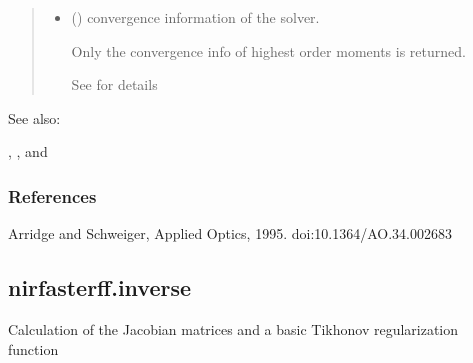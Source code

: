 \documentclass[letterpaper,10pt,english]{sphinxmanual}
\begin{document}
\begin{fulllineitems}
\begin{quote}
\begin{description}
\begin{itemize}
\item {} 
\sphinxAtStartPar
{} () \textendash{} convergence information of the solver.

\sphinxAtStartPar
Only the convergence info of highest order moments is returned.

\sphinxAtStartPar
See {\hyperref[\detokenize{_autosummary/nirfasterff.utils.ConvergenceInfo:nirfasterff.utils.ConvergenceInfo}]{}} for details

\end{itemize}


\end{description}\end{quote}


\begin{sphinxseealso}{See also:}

\sphinxAtStartPar
{\hyperref[\detokenize{_autosummary/nirfasterff.math.gen_mass_matrix:nirfasterff.math.gen_mass_matrix}]{}}, {\hyperref[\detokenize{_autosummary/nirfasterff.math.gen_sources:nirfasterff.math.gen_sources}]{}}, and {\hyperref[\detokenize{_autosummary/nirfasterff.math.get_field_TRmoments:nirfasterff.math.get_field_TRmoments}]{}}


\end{sphinxseealso}

\subsubsection*{References}

\sphinxAtStartPar
Arridge and Schweiger, Applied Optics, 1995. doi:10.1364/AO.34.002683

\end{fulllineitems}


\sphinxstepscope


\subsection{nirfasterff.inverse}
\label{\detokenize{_autosummary/nirfasterff.inverse:module-nirfasterff.inverse}}\label{\detokenize{_autosummary/nirfasterff.inverse:nirfasterff-inverse}}\label{\detokenize{_autosummary/nirfasterff.inverse::doc}}
\sphinxAtStartPar
Calculation of the Jacobian matrices and a basic Tikhonov regularization function
\end{document}
